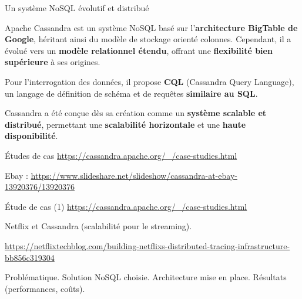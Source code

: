 \begin{frame}{Un système NoSQL évolutif et distribué}

    Apache Cassandra est un système NoSQL basé sur l'\textbf{architecture
    BigTable de Google}, héritant ainsi du modèle de stockage orienté colonnes.
    Cependant, il a évolué vers un \textbf{modèle relationnel étendu}, offrant
    une \textbf{flexibilité bien supérieure} à ses origines.

    Pour l'interrogation des données, il propose \textbf{CQL} (Cassandra Query
    Language), un langage de définition de schéma et de requêtes
    \textbf{similaire au SQL}.

    Cassandra a été conçue dès sa création comme un \textbf{système scalable et
    distribué}, permettant une \textbf{scalabilité horizontale} et une
    \textbf{haute disponibilité}.


\end{frame}

\begin{frame}{Études de cas}
    \url{https://cassandra.apache.org/_/case-studies.html}

    Ebay :
    \url{https://www.slideshare.net/slideshow/cassandra-at-ebay-13920376/13920376}

\end{frame}

\begin{frame}{Étude de cas (1)}
    \url{https://cassandra.apache.org/_/case-studies.html}

    Netflix et Cassandra (scalabilité pour le streaming).

    \url{https://netflixtechblog.com/building-netflixs-distributed-tracing-infrastructure-bb856c319304}

    Problématique. Solution NoSQL choisie. Architecture mise en place. Résultats
    (performances, coûts).


\end{frame}

